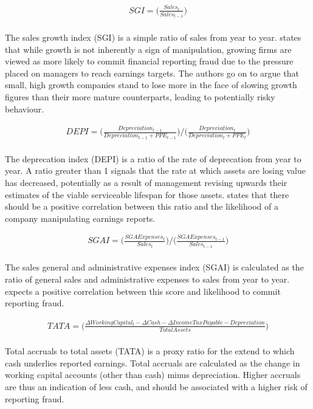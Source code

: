 {\begin{equation}\label{MScore-SGI}
\begin{aligned}
SGI = \bigg(\frac{Sales_t}{Sales_{t-1}} \bigg) 
\end{aligned}
\end{equation}\\
The sales growth index (SGI) is a simple ratio of sales from year to year. \cite{beneishOG} states that while growth is not inherently a sign of manipulation, growing firms are viewed as more likely to commit financial reporting fraud due to the pressure placed on managers to reach earnings targets. The authors go on to argue that small, high growth companies stand to lose more in the face of slowing growth figures than their more mature counterparts, leading to potentially risky behaviour.  

\begin{equation}\label{MScore-DEPI}
\begin{aligned}
DEPI = \bigg(\frac{Depreciation_{t-1}}{Depreciation_{t-1} + PPE_{t-1}} \bigg) /   \bigg(\frac{Depreciation_{t}}{Depreciation_{t} + PPE_{t}} \bigg)
\end{aligned}
\end{equation}\\
The deprecation index (DEPI) is a ratio of the rate of deprecation from year to year. A ratio greater than 1 signals that the rate at which assets are losing value has decreased, potentially as a result of management revising upwards their estimates of the viable serviceable lifespan for those assets. \cite{beneishOG} states that there should be a positive correlation between this ratio and the likelihood of a company manipulating earnings reports.     

\begin{equation}\label{MScore-SGAI}
\begin{aligned}
SGAI = \bigg(\frac{SGA Expenses_{t}}{Sales_{t}} \bigg) /  \bigg(\frac{SGA Expenses_{t-1}}{Sales_{t-1}} \bigg)
\end{aligned}
\end{equation}\\
The sales general and administrative expenses index (SGAI) is calculated as the ratio of general sales and administrative expenses to sales from year to year. \cite{beneishOG} expects a positive correlation between this score and likelihood to commit reporting fraud.  

\begin{equation}\label{MScore-TATA}
\begin{aligned}
TATA = \bigg(\frac{\Delta Working Capital_t - \Delta Cash - \Delta Income Tax Payable - Depreciation }{Total Assets} \bigg) 
\end{aligned}
\end{equation}\\
Total accruals to total assets (TATA) is a proxy ratio for the extend to which cash underlies reported earnings. Total accruals are calculated as the change in working capital accounts (other than cash) minus depreciation. Higher accruals are thus an indication of less cash, and should be associated with a higher risk of reporting fraud.  

}
